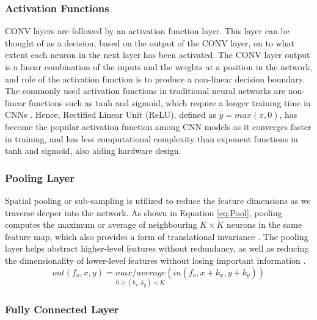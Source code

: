 \documentclass[12pt]{article}
\begin{document}
\subsubsection{Activation Functions}
\label{sec:Background-CNN-Activation}


CONV layers are followed by an activation function layer. This layer can be thought of as a decision, based on the output of the CONV layer, on to what extent each neuron in the next layer has been activated. The CONV layer output is a linear combination of the inputs and the weights at a position in the network, and role of the activation function is to produce a non-linear decision boundary. The commonly used activation functions in traditional neural networks are non-linear functions such as tanh and sigmoid, which require a longer training time in CNNs \cite{AlexNet}. Hence, Rectified Linear Unit (ReLU), defined as $y = max(x,0)$, has become the popular activation function among CNN models as it converges faster in training, and has less computational complexity than exponent functions in tanh and sigmoid, also aiding hardware design.

\subsubsection{Pooling Layer}
\label{sec:Background-CNN-Pool}


Spatial pooling or sub-sampling is utilized to reduce the feature dimensions as we traverse deeper into the network. As shown in Equation \ref{eq:Pool}, pooling computes the maximum or average of neighbouring $K\times K$ neurons in the same feature map, which also provides a form of translational invariance \cite{PoolAnalysis}. The pooling layer helps abstract higher-level features without redundancy, as well as reducing the dimensionality of lower-level features without losing important information \cite{SudaFpgaAccelerator}.
\begin{equation}
out(f_o,x,y)=\underset{0\geqslant (k_x,k_y)<K}{max/average}(in(f_o,x+k_x,y+k_y))
\label{eq:Pool}
\end{equation}

\subsubsection{Fully Connected Layer}
\label{sec:Background-CNN-FC}
\end{document}
